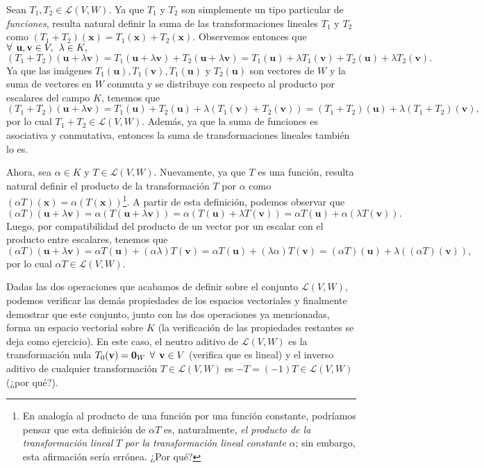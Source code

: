 \documentclass[12pt]{article}
\begin{document}
Sean $T_1, T_2\in\mathcal{L}(V,W)$. Ya que $T_1$ y $T_2$ son simplemente un tipo particular de \emph{funciones}, resulta natural definir la suma de las transformaciones lineales $T_1$ y $T_2$ como $(T_1+T_2)(\mathbf{x})=T_1(\mathbf{x})+T_2(\mathbf{x})$. Observemos entonces que $\forall\hspace{1.5mm} \mathbf{u},\mathbf{v}\in V, \hspace{1.5mm} \lambda\in K,$  \[
    (T_1+T_2)(\mathbf{u}+\lambda\mathbf{v})=T_1(\mathbf{u}+\lambda\mathbf{v})+T_2(\mathbf{u}+\lambda\mathbf{v})=T_1(\mathbf{u})+\lambda T_1(\mathbf{v})+T_2(\mathbf{u})+\lambda T_2(\mathbf{v})
    .\] Ya que las imágenes $T_1(\mathbf{u}), T_1(\mathbf{v}), T_1(\mathbf{u})$ y $T_2(\mathbf{u})$  son vectores de $W$ y la suma de vectores en $W$ conmuta y se distribuye con respecto al producto por escalares del campo $K$, tenemos que \[
    (T_1+T_2)(\mathbf{u}+\lambda\mathbf{v})=T_1(\mathbf{u})+T_2(\mathbf{u})+\lambda (T_1(\mathbf{v})+T_2(\mathbf{v}))=(T_1+T_2)(\mathbf{u})+\lambda(T_1+T_2)(\mathbf{v})
    ,\] por lo cual $T_1+T_2\in\mathcal{L}(V,W)$. Además, ya que la suma de funciones es asociativa y conmutativa, entonces la suma de transformaciones lineales también lo es.

\vspace{3mm}
Ahora, sea $\alpha\in K$ y $T\in\mathcal{L}(V,W)$. Nuevamente, ya que $T$ es una función, resulta natural definir el producto de la transformación $T$ por $\alpha$ como $(\alpha T)(\mathbf{x})=\alpha(T(\mathbf{x}))$\footnote{En analogía al producto de una función por una función constante, podríamos pensar que esta definición de $\alpha T$ es, naturalmente, \emph{el producto de la transformación lineal} $T$ \emph{por la transformación lineal constante} $\alpha$; sin embargo, esta afirmación sería errónea. ¿Por qué?}. A partir de esta definición, podemos observar que \[
    (\alpha T)(\mathbf{u}+\lambda\mathbf{v})=\alpha(T(\mathbf{u}+\lambda\mathbf{v}))=\alpha(T(\mathbf{u})+\lambda T(\mathbf{v}))=\alpha T(\mathbf{u})+\alpha(\lambda T(\mathbf{v}))
.\] Luego, por compatibilidad del producto de un vector por un escalar con el producto entre escalares, tenemos que \[
(\alpha T)(\mathbf{u}+\lambda\mathbf{v})=\alpha T(\mathbf{u})+(\alpha\lambda)T(\mathbf{v})=\alpha T(\mathbf{u})+(\lambda\alpha)T(\mathbf{v}) = (\alpha T)(\mathbf{u})+\lambda((\alpha T)(\mathbf{v}))
,\] por lo cual $\alpha T\in\mathcal{L}(V,W)$.

\vspace{3mm}
Dadas las dos operaciones que acabamos de definir sobre el conjunto $\mathcal{L}(V,W)$, podemos verificar las demás propiedades de los espacios vectoriales y finalmente demostrar que este conjunto, junto con las dos operaciones ya mencionadas, forma un espacio vectorial sobre $K$ (la verificación de las propiedades restantes se deja como ejercicio). En este caso, el neutro aditivo de $\mathcal{L}(V,W)$ es la transformación nula $T_0(\mathbf{v})=\mathbf{0}_W\hspace{1.5mm} \forall\hspace{1.5mm} \mathbf{v}\in V$ (verifica que es lineal) y el inverso aditivo de cualquier transformación $T\in\mathcal{L}(V,W)$ es $-T=(-1)T\in\mathcal{L}(V,W)$ (¿por qué?).
\end{document}
